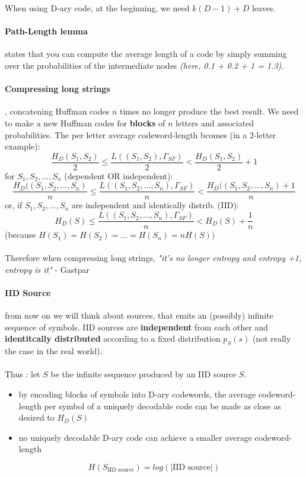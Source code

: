 \documentclass{article}
\begin{document}
When using D-ary code, at the beginning, we need $ k(D-1) + D $ leaves.

\paragraph{Path-Length lemma} states that you can compute the average length of a code by simply summing over the probabilities of the intermediate nodes \textit{(here, 0.1 + 0.2 + 1 = 1.3)}.

\newpage

\paragraph{Compressing long strings}, concatening Huffman codes $ n $ times no longer produce the best result. We need to make a new Huffman codes for \textbf{blocks} of $ n $ letters and associated probabilities. The per letter average codeword-length bcomes (in a 2-letter example):
\[ \frac{H_D(S_1, S_2)}{2} \leq \frac{L((S_1, S_2), \Gamma_{SF})}{2} < \frac{H_D(S_1, S_2)}{2}  + 1 \]
for $ S_1, S_2, ..., S_n $ (dependent OR independent):
\[ \frac{H_D((S_1, S_2, ..., S_n)}{n} \leq \frac{L((S_1, S_2, ..., S_n), \Gamma_{SF})}{n} < \frac{H_D((S_1, S_2, ..., S_n) + 1}{n} \]
or, if $ S_1, S_2, ..., S_n $ are independent and identically distrib. (IID):
\[ H_D(S) \leq \frac{L((S_1, S_2, ..., S_n), \Gamma_{SF})}{n} < H_D(S) + \frac{1}{n} \]
(because $ H(S_1) = H(S_2) = ... = H(S_n) = nH(S)) $\\\\
Therefore when compressing long strings, \textit{"it's no longer entropy and entropy +1, entropy is it"} - Gastpar

\paragraph{IID Source} from now on we will think about sources, that emits an (possibly) infinite sequence of symbols. IID sources are \textbf{independent} from each other and \textbf{identitcally distributed} according to a fixed distribution $ p_S(s) $ (not really the case in the real world).\\\\Thus : let $ S $ be the infinite sequence produced by an IID source $ S $.
\begin{itemize}
    \item by encoding blocks of symbols into D-ary codewords, the average codeword-length per symbol of a uniquely decodable code can be made as close as desired to $ H_D(S) $
    \item no uniquely decodable D-ary code can achieve a smaller average codeword-length
\end{itemize}
\[ H(S_{\text{IID source}}) = log(|\text{IID source}|) \]
\end{document}
